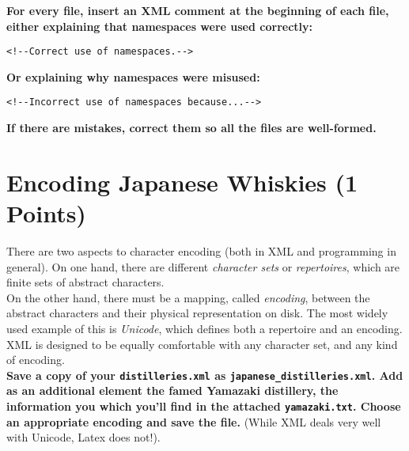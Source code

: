 \documentclass[a4paper, 12pt]{scrartcl}
\begin{document}
\noindent \textbf{For every file, insert an XML comment at the beginning of each file, either explaining that namespaces were used correctly:}

\begin{lstlisting}
<!--Correct use of namespaces.-->
\end{lstlisting}

\noindent \textbf{Or explaining why namespaces were misused:}

\begin{lstlisting}
<!--Incorrect use of namespaces because...-->
\end{lstlisting}

\noindent \textbf{If there are mistakes, correct them so all the files are well-formed.}

\section{Encoding Japanese Whiskies (1 Points)}

There are two aspects to character encoding (both in XML and programming in general). On one hand, there are different \textit{character sets} or \textit{repertoires}, which are finite sets of abstract characters.\\ 

\noindent On the other hand, there must be a mapping, called \textit{encoding}, between the abstract characters and their physical representation on disk. The most widely used example of this is \textit{Unicode}, which defines both a repertoire and an encoding.\\

\noindent XML is designed to be equally comfortable with any character set, and any kind of encoding. \\

\noindent \textbf{Save a copy of your \texttt{distilleries.xml} as \texttt{japanese\_distilleries.xml}. Add as an additional element the famed Yamazaki distillery, the information you which you'll find in the attached \texttt{yamazaki.txt}.  Choose an appropriate encoding and save the file.} (While XML deals very well with Unicode, Latex does not!).
\end{document}
